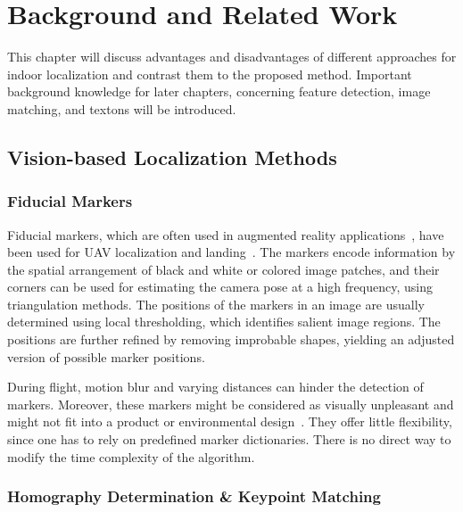 \chapter{Background and Related Work}
\label{chap:relatedwork}

This chapter will discuss advantages and disadvantages of different approaches for indoor localization and
contrast them to the proposed method. Important
background knowledge for later chapters, concerning feature detection,
image matching, and textons will be introduced.

\section{Vision-based Localization Methods}

\subsection{Fiducial Markers}
\label{sec:fiducialmarkers}

Fiducial markers, which are often used in augmented reality
applications~\cite{kato1999marker,garrido2014automatic}, have been
used for UAV localization and
landing~\cite{eberli2011vision,bebop2015}.
The markers encode information by the spatial arrangement of
black and white or colored image patches, and their corners can be
used for estimating the camera pose at a high frequency, using
triangulation methods. The positions of the markers in
an image are usually determined using local thresholding, which identifies salient image
regions. The positions are further refined by removing improbable shapes,
yielding an adjusted version of possible marker positions.

During flight, motion blur and varying distances can hinder the
detection of markers. Moreover, these markers might be considered as
visually unpleasant and might not fit into a product or environmental
design~\cite{chu2013halftone}. They offer little
flexibility, since one has to rely on predefined marker dictionaries.
There is no direct way to modify the time complexity of the algorithm.


\subsection{Homography Determination \& Keypoint Matching}
\label{sec:keypointmatching}

